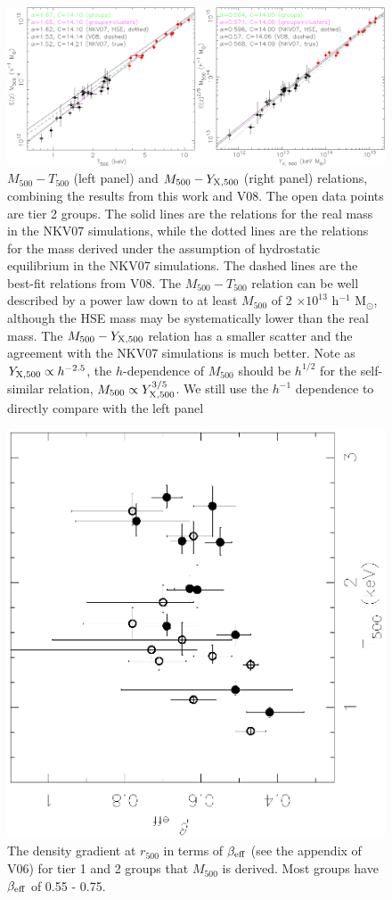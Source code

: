 \documentclass{aastex}
\begin{document}
\begin{figure}
\centerline{\includegraphics[height=0.42\linewidth]{f15.eps}}
  \caption{$M_{500} - T_{500}$ (left panel) and $M_{500} - Y_{\rm X, 500}$ (right panel) relations, combining the
results from this work and V08. The open data points are tier 2 groups. The solid
lines are the relations for the real mass in the NKV07 simulations, while the dotted
lines are the relations for the mass derived under the assumption of hydrostatic
equilibrium in the NKV07 simulations. The dashed lines are the best-fit relations from
V08. The $M_{500} - T_{500}$ relation can be well described by a power law down to at
least $M_{500}$ of 2 $\times 10^{13}$ h$^{-1}$ M$_{\odot}$, although the HSE mass
may be systematically lower than the real mass. The $M_{500} - Y_{\rm X, 500}$ relation
has a smaller scatter and the agreement with the NKV07 simulations is much better.
Note as $Y_{\rm X, 500} \propto h^{-2.5}$, the $h$-dependence of $M_{500}$ should be
$h^{1/2}$ for the self-similar relation, $M_{500} \propto Y_{\rm X, 500}^{3/5}$.
We still use the $h^{-1}$ dependence to directly compare with the left panel
}
\end{figure}

\begin{figure}
\centerline{\includegraphics[height=0.45\linewidth,angle=270]{f16.ps}}
  \caption{The density gradient at $r_{500}$ in terms of $\beta_{\rm eff}$
(see the appendix of V06) for tier 1 and 2 groups that $M_{500}$ is derived.
Most groups have $\beta_{\rm eff}$ of 0.55 - 0.75.
}
\end{figure}
\end{document}
